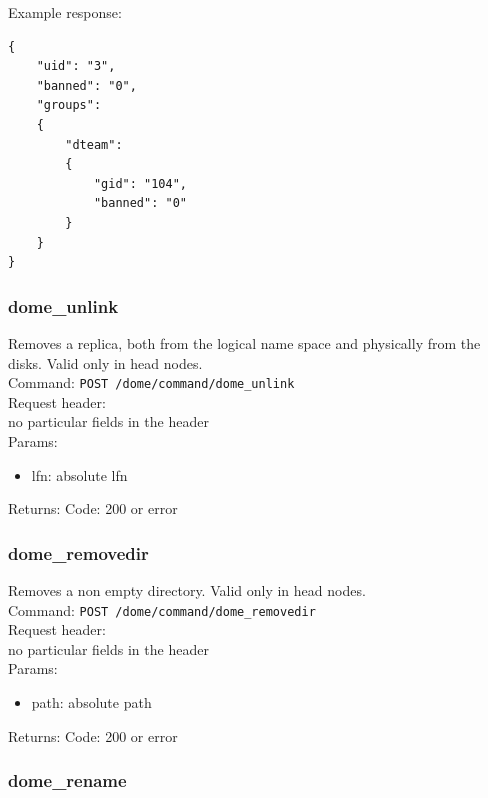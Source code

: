 \documentclass[a4paper,10pt]{scrreprt}
\begin{document}
Example response:\\
\begin{lstlisting}
{
    "uid": "3",
    "banned": "0",
    "groups":
    {
        "dteam":
        {
            "gid": "104",
            "banned": "0"
        }
    }
}
\end{lstlisting}


\subsubsection{dome\_unlink}

Removes a replica, both from the logical name space and physically from the disks. Valid only in head nodes.\\
Command:
\lstinline"POST /dome/command/dome_unlink"\\

Request header:\\
no particular fields in the header\\

Params:
\begin{itemize}
 \item lfn: absolute lfn
\end{itemize}

Returns:
Code: 200 or error





\subsubsection{dome\_removedir}

Removes a non empty directory. Valid only in head nodes.\\
Command:
\lstinline"POST /dome/command/dome_removedir"\\

Request header:\\
no particular fields in the header\\

Params:
\begin{itemize}
 \item path: absolute path
\end{itemize}

Returns:
Code: 200 or error



\subsubsection{dome\_rename}
\end{document}
